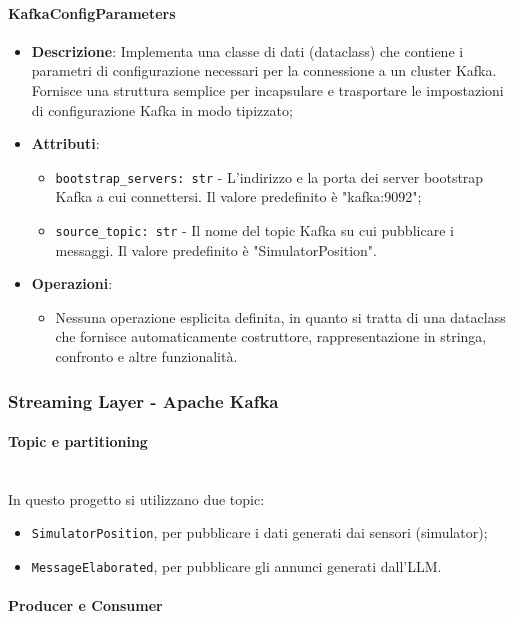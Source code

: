 \documentclass[10pt]{article}
\newcommand{\myparagraph}[1]{\paragraph{#1}\mbox{}\\}
\begin{document}
    \paragraph{KafkaConfigParameters}
    \begin{itemize} 
    \item \textbf{Descrizione}: Implementa una classe di dati (dataclass) che contiene i parametri di configurazione necessari per la connessione a un cluster Kafka. Fornisce una struttura semplice per incapsulare e trasportare le impostazioni di configurazione Kafka in modo tipizzato;
    \item \textbf{Attributi}:
    \begin{itemize}
        \item \texttt{bootstrap\_servers: str} - L'indirizzo e la porta dei server bootstrap Kafka a cui connettersi. Il valore predefinito è "kafka:9092";
        \item \texttt{source\_topic: str} - Il nome del topic Kafka su cui pubblicare i messaggi. Il valore predefinito è "SimulatorPosition".
    \end{itemize}
    
    \item \textbf{Operazioni}:
    \begin{itemize}
        \item Nessuna operazione esplicita definita, in quanto si tratta di una dataclass che fornisce automaticamente costruttore, rappresentazione in stringa, confronto e altre funzionalità.
    \end{itemize}
    \end{itemize}
    
    \newpage

    \subsubsection{Streaming Layer - Apache Kafka}
        
        \myparagraph{Topic e partitioning}
        In questo progetto si utilizzano due topic:
        \begin{itemize}
        \item \texttt{SimulatorPosition}, per pubblicare i dati generati dai sensori (simulator);
        \item \texttt{MessageElaborated}, per pubblicare gli annunci generati dall’LLM.
        \end{itemize}

        \myparagraph{Producer e Consumer}
\end{document}
